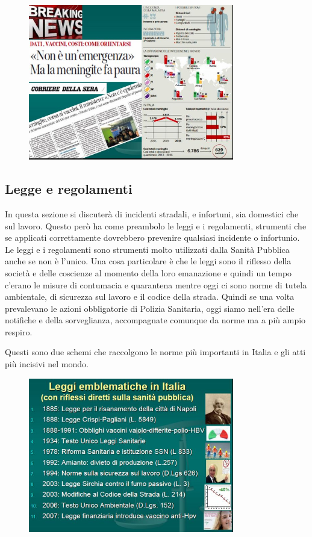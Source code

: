 \begin{figure}[!ht]
\centering
	\includegraphics[width=0.8\textwidth]{28/image1.jpg}
	\end{figure}

\subsection{Legge e regolamenti}

In questa sezione si discuterà di incidenti stradali, e infortuni, sia
domestici che sul lavoro. Questo però ha come preambolo le leggi e i
regolamenti, strumenti che se applicati correttamente dovrebbero
prevenire qualsiasi incidente o infortunio.
Le leggi e i regolamenti sono strumenti molto utilizzati dalla Sanità
Pubblica anche se non è l'unico. Una cosa particolare è che le leggi
sono il riflesso della società e delle coscienze al momento della loro
emanazione e quindi un tempo c'erano le misure di contumacia e
quarantena mentre oggi ci sono norme di tutela ambientale, di sicurezza
sul lavoro e il codice della strada. Quindi se una volta prevalevano le
azioni obbligatorie di Polizia Sanitaria, oggi siamo nell'era delle
notifiche e della sorveglianza, accompagnate comunque da norme ma a più
ampio respiro.

Questi sono due schemi che raccolgono le norme più importanti in Italia
e gli atti più incisivi nel mondo.

\begin{figure}[!ht]
\centering
	\includegraphics[width=0.8\textwidth]{28/image2.jpg}
	\end{figure}
	
